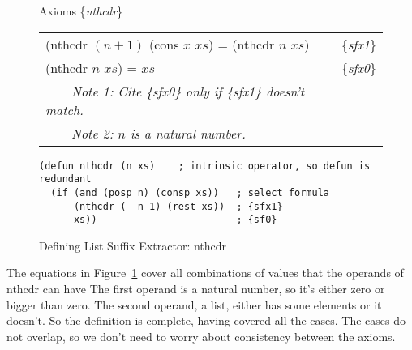 \begin{figure}
\begin{center}
Axioms \{\emph{nthcdr}\} \\
\begin{tabular}{ll}
(nthcdr $(n+1)$ (cons $x$ $xs$) = (nthcdr $n$ $xs$) & \{\emph{sfx1}\} \\
(nthcdr $n$ $xs$) = $xs$                            & \{\emph{sfx0}\}   \\
~~~~\emph{Note 1: Cite \{\emph{sfx0}\} only if \{\emph{sfx1}\} doesn't match.}&\\
~~~~\emph{Note 2: $n$ is a natural number.}
\end{tabular}
\begin{Verbatim}
(defun nthcdr (n xs)    ; intrinsic operator, so defun is redundant
  (if (and (posp n) (consp xs))   ; select formula
      (nthcdr (- n 1) (rest xs))  ; {sfx1}
      xs))                        ; {sf0}
\end{Verbatim}
\end{center}
\caption{Defining List Suffix Extractor: nthcdr}
\label{fig:nthcdr-defun}
\end{figure}


The equations in Figure~\ref{fig:nthcdr-defun} cover all combinations
of values that the operands of nthcdr can have
The first operand is a natural number,
so it's either zero or bigger than zero.
The second operand, a list, either has some elements or it doesn't.
So the definition is complete, having covered all the cases.
The cases do not overlap, so we don't need to worry about
consistency between the axioms.

